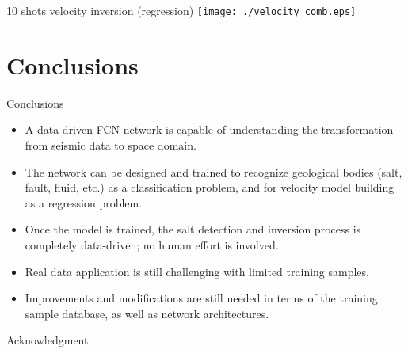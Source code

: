 \documentclass[aspectratio=169]{beamer}
\begin{document}
\begin{frame}{10 shots velocity inversion (regression)}
\centering
 \texttt{[image: ./velocity\_comb.eps]}
\end{frame}
\section{Conclusions}
\begin{frame}{Conclusions}
\begin{itemize}
\item{A data driven FCN network is capable of understanding the transformation from seismic data to space domain.}
\item{The network can be designed and trained to recognize geological bodies (salt, fault, fluid, etc.) as a classification problem, and for velocity model building as a regression problem.}
\item{Once the model is trained, the salt detection and inversion process is completely data-driven; no human effort is involved.}
\item{Real data application is still challenging with limited training samples.}
\item{Improvements and modifications are still needed in terms of the training sample database, as well as network architectures.}
\end{itemize}
\end{frame}
\begin{frame}{Acknowledgment}
\end{frame}
\end{document}
